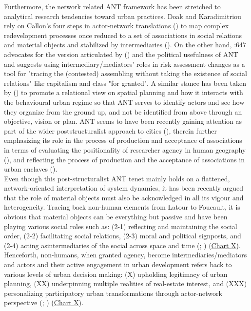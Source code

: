 \documentclass[11pt]{report}
\begin{document}
{{{{Furthermore, the network related ANT framework has been stretched to analytical research tendencies toward urban practices. Doak and Karadimitriou rely on Callon’s four steps in actor-network translations  (\href{Callon}{\citealt{callon_elements_1986}}) to map complex redevelopment processes once reduced to a set of associations in social relations and material objects and stabilized by intermediaries (\href{Doak}{\citealt{doak_re_2007}}). On the other hand, \href{Holifield}{\cite{holifield_actor-network_2009}:647}  advocates for the version articulated by (\href{Latour}{\citealt{latour_actor-network_1996}}) and the political usefulness of ANT and suggests using  intermediary/mediators' roles in risk assessment changes as a tool for "tracing the (contested) assembling without taking the existence of social relations" like capitalism and class "for granted". A similar stance has been taken by (\href{Boelens}{\citealt{boelens_theorizing_2010}}) to promote a relational view on spatial planning and how it interacts with the behavioural urban regime so that ANT serves to identify actors and see how they organize from the ground up, and not be identified from above through an objective, vision or plan. ANT seems to have been recently gaining attention as part of the wider poststructuralist approach to cities  (\href{Smith}{\citealt{smith_ordinary_2013}}), therein further emphasizing its role in the process of production and acceptance of associations in terms of evaluating the positionality of researcher agency in human geography (\href{Ruming}{\citealt{ruming_following_2009}}), and  reflecting the process of production and the acceptance of associations in urban enclaves (\href{Wissink}{\citealt{wissink_enclave_2013}}).
\\

Even though this post-structuralist ANT tenet mainly holds on a flattened, network-oriented interpretation of system dynamics, it has been recently argued that the role of material objects must also be acknowledged in all its vigour and heterogeneity. Tracing back non-human elements from Latour to Foucault, it is obvious that material objects can be everything but passive and have been playing various social roles such as: (2-1) reflecting and maintaining the social order, (2-2) facilitating social relations, (2-3) moral and political signposts, and (2-4) acting asintermediaries of the social across space and time (\href{Sayes}{\citealt{sayes_actor-network_2014}}; \href{Van Assche}{\citealt{van_assche_power_2014}}) (\href{Table 1}{Chart X}). Henceforth, non-humans, when granted agency, become intermediaries/mediators and actors and their active engagement in urban development refers back to various levels of urban decision making: (X) upholding legitimacy of urban planning, (XX) underpinning multiple realities of real-estate interest, and (XXX) personalizing participatory urban transformations through actor-network perspective (\href{Latour}{\citealt{latour_actor-network_1996}}; \href{Rydin}{\citealt{rydin_actor-network_2010}} \href{Van Assche}{\citealt{van_assche_power_2014}}) (\href{Table 1}{Chart X}).
\\

}}}}
\end{document}
